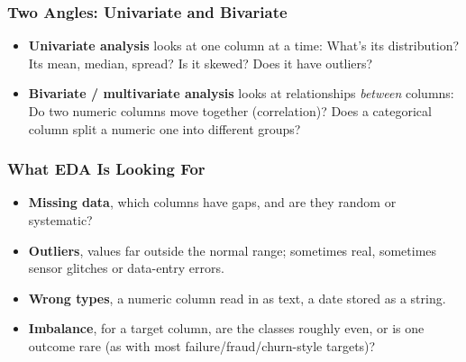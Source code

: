 \begin{frame}[fragile]\frametitle{Two Angles: Univariate and Bivariate}
\begin{itemize}
\item \textbf{Univariate analysis} looks at one column at a time: What's its distribution?
  Its mean, median, spread? Is it skewed? Does it have outliers?
\item \textbf{Bivariate / multivariate analysis} looks at relationships \emph{between}
  columns: Do two numeric columns move together (correlation)? Does a categorical column
  split a numeric one into different groups?
\end{itemize}
\end{frame}

\begin{frame}[fragile]\frametitle{What EDA Is Looking For}
\begin{itemize}
\item \textbf{Missing data}, which columns have gaps, and are they random or systematic?
\item \textbf{Outliers}, values far outside the normal range; sometimes real, sometimes
  sensor glitches or data-entry errors.
\item \textbf{Wrong types}, a numeric column read in as text, a date stored as a string.
\item \textbf{Imbalance}, for a target column, are the classes roughly even, or is one
  outcome rare (as with most failure/fraud/churn-style targets)?
\end{itemize}
\end{frame}

